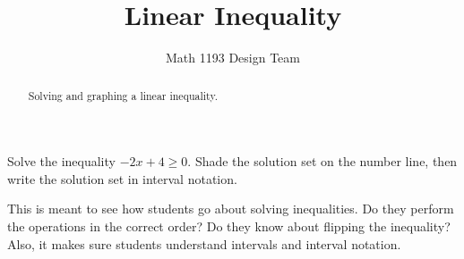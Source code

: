 \documentclass[noauthor]{ximera}
\title{Linear Inequality}
\author{Math 1193 Design Team}
\begin{document}
\begin{abstract}
    Solving and graphing a linear inequality.
\end{abstract}
\maketitle

Solve the inequality \(-2x + 4 \ge 0\). Shade the 
solution set on the number line, then write the 
solution set in interval notation.

\begin{instructorNotes}
This is meant to see how students go about solving inequalities. 
Do they perform the operations in the correct order? Do they know 
about flipping the inequality? Also, it makes sure students understand 
intervals and interval notation.
\end{instructorNotes}
\end{document}
